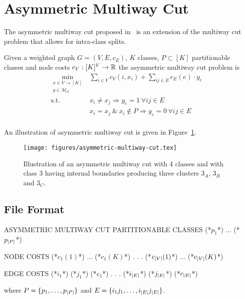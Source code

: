 \section{Asymmetric Multiway Cut}
The asymmetric multiway cut proposed in~\cite{kroeger2014asymmetric} is an extension of the multiway cut problem that allows for intra-class splits.

\begin{definition}
Given a weighted graph $G=(V,E,c_E)$, $K$ classes, $P \subset [K]$ partitionable classes and node costs $c_V : [K]^V \rightarrow \mathbb{R}$ the asymmetric multiway cut problem is
\begin{equation}
    \begin{array}{rl}
    \min\limits_{\substack{x \in V \rightarrow [K]\\ y \in \mathcal{M}_G}}
    & \sum_{i \in V} c_V(i,x_i) + \sum_{ij \in E} c_E(e) \cdot y_e \\
    \text{s.t.}
    & x_i \neq x_j \Rightarrow y_e = 1\ \forall ij \in E \\
    & x_i = x_j \ \&\ x_i \notin P \Rightarrow y_e = 0\ \forall ij \in E \\
    \end{array}
\end{equation}
\end{definition}

An illustration of asymmetric multiway cut is given in Figure~\ref{fig:asymmetric-multiway-cut}.

\begin{figure}[H]
    \begin{center}
        \texttt{[image: figures/asymmetric-multiway-cut.tex]}
    \end{center}
    \caption{Illustration of an asymmetric multiway cut with 4 classes and with class 3 having internal boundaries producing three clusters $3_A$, $3_B$ and $3_C$.}
    \label{fig:asymmetric-multiway-cut}
\end{figure}

\subsection{File Format}

\begin{fileformat}
ASYMMETRIC MULTIWAY CUT
PARTITIONABLE CLASSES
(*$p_1$*) ... (*$p_{\lvert P\rvert}$*)

NODE COSTS
(*$c_1(1)$*) ... (*$c_1(K)$*) 
.
.
.
(*$c_{\lvert V\rvert}(1)$*) ... (*$c_{\lvert V\rvert}(K)$*)  

EDGE COSTS
(*$i_1$*) (*$j_1$*) (*$c_1$*)
.
.
.
(*$i_{\lvert E\rvert}$*) (*$j_{\lvert E\rvert}$*) (*$c_{\lvert E\rvert}$*)
\end{fileformat}
where $P = \{p_1,\ldots,p_{\lvert P\rvert}\}$ and
$E = \{i_1 j_1,\ldots,i_{\lvert E\rvert} j_{\lvert E\rvert}\}$.

